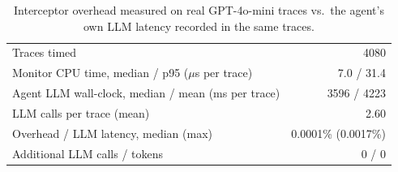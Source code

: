 \begin{table}[t]\centering\small
\caption{Interceptor overhead measured on real GPT-4o-mini traces vs.\ the agent's own LLM latency recorded in the same traces.}
\label{tab:C4}
\begin{tabular}{lr}
\toprule
Traces timed & 4080 \\
Monitor CPU time, median / p95 ($\mu$s per trace) & 7.0 / 31.4 \\
Agent LLM wall-clock, median / mean (ms per trace) & 3596 / 4223 \\
LLM calls per trace (mean) & 2.60 \\
Overhead / LLM latency, median (max) & 0.0001\% (0.0017\%) \\
Additional LLM calls / tokens & 0 / 0 \\
\bottomrule
\end{tabular}
\end{table}
